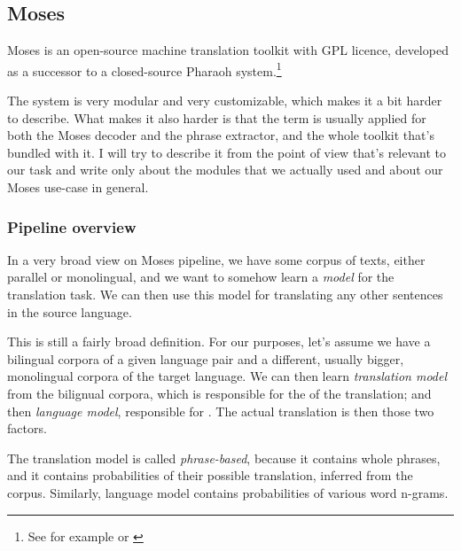 
\subsection{Moses}
\label{moses}
Moses is an open-source machine translation toolkit with GPL licence, developed as a successor to a closed-source Pharaoh system.\footnote{See for example \cite{mosespaper} or \cite{moseslink}}

The system is very modular and very customizable, which makes it a bit harder to describe. What makes it also harder is that the term  is usually applied for both the  Moses decoder and the phrase extractor, and the whole toolkit that's bundled with it. I will try to describe it from the point of view that's relevant to our task and write only about the modules that we actually used and about our Moses use-case in general.



\subsubsection{Pipeline overview}
In a very broad view on Moses pipeline, we have some corpus of texts, either parallel or monolingual, and we want to somehow learn a \emph{model} for the translation task. We can then use this model for translating any other sentences in the source language.

This is still a fairly broad definition. For our purposes, let's assume we have a bilingual corpora of a given language pair and a different, usually bigger, monolingual corpora of the target language. We can then learn \emph{translation model} from the bilignual corpora, which is responsible for the  of the translation; and then \emph{language model}, responsible for . The actual translation is then  those two factors.

The translation model is called \emph{phrase-based}, because it contains whole phrases, and it contains probabilities of their possible translation, inferred from the corpus. 
Similarly, language model contains probabilities of various word n-grams. 

